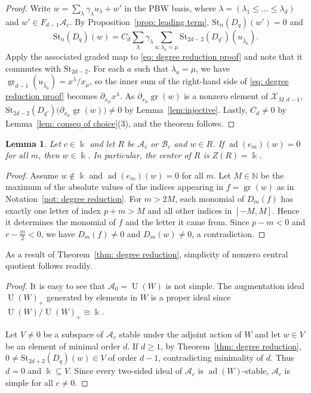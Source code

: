\documentclass[12pt]{amsart}
\theoremstyle{plain}
\newtheorem{lemma}[theorem]{Lemma}
\theoremstyle{definition}
\numberwithin{equation}{theorem}
\newcommand{\kk}{\Bbbk}
\newcommand{\UU}{\operatorname{U}}
\newcommand{\ad}{\operatorname{ad}}
\newcommand{\gr}{\operatorname{gr}}
\newcommand{\NN}{\mathbb{N}}
\newcommand{\mc}[1]{\mathcal{#1}}
\newcommand{\calA}{\mathcal A}
\newcommand{\calB}{\mathcal B}
\newcommand{\St}{\mathrm{St}}
\begin{document}
\degreduction*
\begin{proof}
    Write $w = \sum_{\lambda} \gamma_\lambda u_\lambda + w'$ in the PBW basis, where $\lambda = (\lambda_1 \leq \dots \leq \lambda_d)$ and $w'\in F_{d-1}\calA_c$. By Proposition~\ref{prop: leading term}, $\St_n(D_q)(w')=0$ and 
    \begin{equation}\label{eq: degree reduction proof}
        \St_n (D_q) (w) = C_d \sum_{\lambda} \gamma_\lambda \sum_{a: \lambda_a = \mu} \St_{2d-2}(D_{q'}) (u_{\hat{\lambda}_a}) \tag{1.4.2}.
    \end{equation} 
    Apply the associated graded map to \eqref{eq: degree reduction proof} and note that it commutes with $\St_{2d-2}$. For each $a$ such that $\lambda_a=\mu$, we have $\gr_{d-1}(u_{\hat{\lambda}_a}) = x^\lambda / x_\mu$, so the inner sum of the right-hand side of \eqref{eq: degree reduction proof} becomes $\partial_{x_\mu} x^\lambda$. As $\partial_{x_\mu} \gr(w)$ is a nonzero element of $\mc{X}_{M, d-1}$,  $\St_{2d-2}(D_{q'}) \big( \partial_{x_\mu} \gr(w) \big) \neq 0$ by Lemma~\ref{lem:injective}. Lastly, $C_d \neq 0$ by Lemma~\ref{lem: conseq of choice}(3), and the theorem follows.
\end{proof}

\begin{lemma}\label{lem: center of Bc}
    Let $c \in \kk$ and let $R$ be $\calA_c$ or $\calB_c$ and $w \in R$. If $\ad(e_m)(w) = 0$ for all $m$, then $w \in \kk$. In particular, the center of $R$ is $Z(R) = \kk$.
\end{lemma}
\begin{proof}
    Assume $w \notin \kk$ and $\ad(e_m)(w) = 0$ for all $m$. Let $M \in \NN$ be the maximum of the absolute values of the indices appearing in $f = \gr(w)$ as in Notation~\ref{not: degree reduction}. For $m > 2M$, each monomial of $D_m(f)$ has exactly one letter of index $p+m > M$ and all other indices in $[-M,M]$. Hence it determines the monomial of $f$ and the letter it came from. Since $p-m < 0$ and $r-\frac{m}{2} < 0$, we have $D_m(f) \neq 0$ and $D_m(w) \neq 0$, a contradiction.
\end{proof}


As a result of Theorem~\ref{thm: degree reduction}, simplicity of nonzero central quotient follows readily. 
\simpleVir*
\begin{proof}
    It is easy to see that $\calA_0 = \UU(W)$ is not simple. The augmentation ideal $\UU(W)_+$ generated by elements in $W$ is a proper ideal since $\UU(W)/\UU(W)_+ \cong \kk$.

    Let $V \neq 0$ be a subspace of $\calA_c$ stable under the adjoint action of $W$ and let $w \in V$ be an element of minimal order $d$. If $d \geq 1$, by Theorem~\ref{thm: degree reduction}, $0 \neq \St_{2d+2}(D_q)(w) \in V$ of order $d-1$, contradicting minimality of $d$. Thus $d=0$ and $\kk \subseteq V$. Since every two-sided ideal of $\calA_c$ is $\ad(W)$-stable, $\calA_c$ is simple for all $c \neq 0$.
\end{proof}
\end{document}
